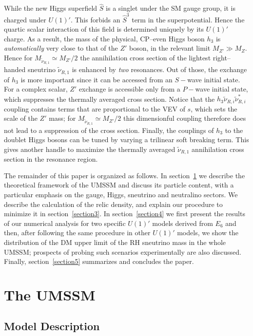 \documentclass[a4paper,11pt]{article}
\begin{document}
While the new Higgs superfield $\hat S$ is a singlet under the SM
gauge group, it is charged under $U(1)'$. This forbids an $\hat S^3$
term in the superpotential. Hence the quartic scalar interaction of
this field is determined uniquely by its $U(1)'$ charge. As a result,
the mass of the physical, CP--even Higgs boson $h_3$ is {\em
  automatically} very close to that of the $Z'$ boson, in the relevant
limit $M_{Z'} \gg M_Z$. Hence for
$M_{\tilde \nu_{R,1}} \simeq M_{Z'}/2$ the annihilation cross section
of the lightest right--handed sneutrino $\tilde \nu_{R,1}$ is enhanced
by {\em two} resonances. Out of those, the exchange of $h_3$ is more
important since it can be accessed from an $S-$wave initial state.
For a complex scalar, $Z'$ exchange is accessible only from a $P-$wave
initial state, which suppresses the thermally averaged cross section.
Notice that the $h_3 \tilde \nu_{R,i} \tilde \nu^*_{R,i}$ coupling
contains terms that are proportional to the VEV of $s$, which sets the
scale of the $Z'$ mass; for $M_{\tilde \nu_{R,1}} \simeq M_{Z'}/2$
this dimensionful coupling therefore does not lead to a suppression of
the cross section. Finally, the couplings of $h_3$ to the doublet
Higgs bosons can be tuned by varying a trilinear soft breaking
term. This gives another handle to maximize the thermally averaged
$\tilde \nu_{R,1}$ annihilation cross section in the resonance region.

The remainder of this paper is organized as follows. In
section~\ref{section2} we describe the theoretical framework of the
UMSSM and discuss its particle content, with a particular emphasis on
the gauge, Higgs, sneutrino and neutralino sectors. We describe the
calculation of the relic density, and explain our procedure to minimize it in section~\ref{section3}. In section~\ref{section4} we
first present the results of our numerical analysis for two specific
$U(1)'$ models derived from $E_6$ and then, after following the same
procedure in other $U(1)'$ models, we show the distribution of the DM
upper limit of the RH sneutrino mass in the whole UMSSM; prospects of
probing such scenarios experimentally are also discussed. Finally,
section~\ref{section5} summarizes and concludes the paper.


\section{The UMSSM}  
\label{section2}

\subsection{Model Description}  
\label{subsection2.1}
\end{document}
